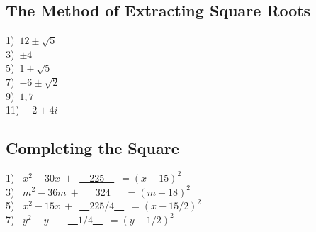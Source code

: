 \documentclass[12pt]{book}
\theoremstyle{definition}
\begin{document}
\subsection*{The Method of Extracting Square Roots}


\begin{multicols}{3}
  1)~$12\pm\sqrt{5}$\\
  3)~$\pm 4$\\
  5)~$1\pm\sqrt{5}$\\
  7)~$-6\pm\sqrt{2}$\\
  9)~$1,7$\\
  11)~$-2\pm 4i$
\end{multicols}

\newpage

\subsection*{Completing the Square}


\begin{multicols}{2}
  1)~ $x^2 - 30 x~+$~\underline{~~225~~}~$=(x-15)^2$\\
  3)~ $m^2 - 36 m~+$~\underline{~~324~~}~$=(m-18)^2$\\
  5)~ $x^2 - 15 x~+$~\underline{~~$225/4$~~}~$=(x-15/2)^2$\\
  7)~ $y^2 - y~+$~\underline{~~$1/4$~~}~$=(y-1/2)^2$%
\end{multicols}
\end{document}
